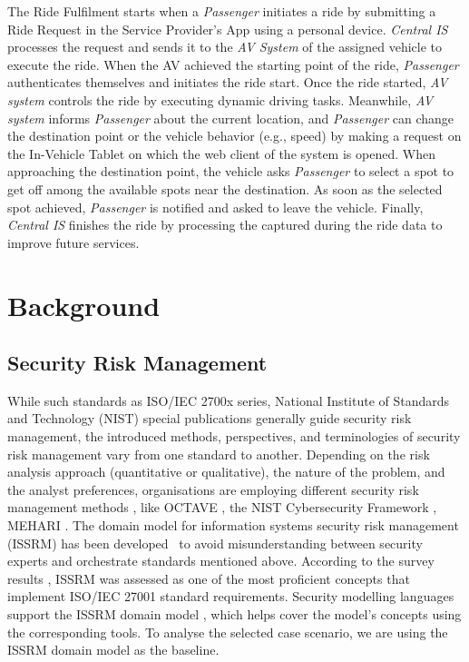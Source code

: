\documentclass[manuscript]{acmart}
\begin{document}
The Ride Fulfilment starts when a \textit{Passenger} initiates a ride by submitting a Ride Request in the Service Provider's App using a personal device. \textit{Central IS} processes the request and sends it to the \textit{AV System} of the assigned vehicle to execute the ride. When the AV achieved the starting point of the ride, \textit{Passenger} authenticates themselves and initiates the ride start. Once the ride started, \textit{AV system} controls the ride by executing dynamic driving tasks. Meanwhile, \textit{AV system}  informs \textit{Passenger} about the current location, and \textit{Passenger} can change the destination point or the vehicle behavior (e.g., speed) by making a request on the In-Vehicle Tablet on which the web client of the system is opened. When approaching the destination point, the vehicle asks \textit{Passenger} to select a spot to get off among the available spots near the destination. As soon as the selected spot achieved, \textit{Passenger} is notified and asked to leave the vehicle. Finally, \textit{Central IS} finishes the ride by processing the captured during the ride data to improve future services.

\section{Background} \label{sec:Background}

\subsection{Security Risk Management}

While such standards as ISO/IEC 2700x series, National Institute of Standards and Technology (NIST) special publications generally guide security risk management, the introduced methods, perspectives, and terminologies of security risk management vary from one standard to another. Depending on the risk analysis approach (quantitative or qualitative), the nature of the problem, and the analyst preferences, organisations are employing different security risk management methods \cite{ISSRM_alignment}, \cite{FundSecSysMod_RaimMat} like OCTAVE%
, the NIST Cybersecurity Framework%
,  MEHARI%
. The domain model for information systems security risk management (ISSRM) has been developed~\cite{Dubois2010} to avoid misunderstanding between security experts and orchestrate standards mentioned above. According to the survey results \cite{ISRM_ISO27_Survey}, ISSRM was assessed as one of the most proficient concepts that implement ISO/IEC 27001 standard requirements. Security modelling languages support the ISSRM domain model \cite{ISSRM_alignment}, which helps cover the model's concepts using the corresponding tools. To analyse the selected case scenario, we are using the ISSRM domain model as the baseline.
\end{document}
